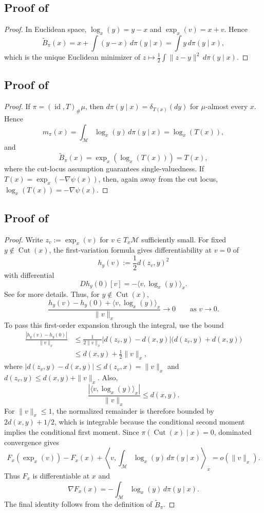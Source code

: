 \documentclass[10pt]{article} %
\theoremstyle{definition}
\providecommand{\1}{\mathbf{1}}
\providecommand{\sM}{\mathcal{M}}
\DeclareMathOperator{\Cut}{Cut}
\DeclareMathOperator{\id}{id}
\begin{document}
\subsection{Proof of }
\begin{proof}
In Euclidean space, $\log_x(y)=y-x$ and $\exp_x(v)=x+v$. Hence
\[
\widetilde B_\pi(x)=x+\int(y-x)\,d\pi(y\mid x)=\int y\,d\pi(y\mid x),
\]
which is the unique Euclidean minimizer of $z\mapsto\frac12\int\|z-y\|^2\,d\pi(y\mid x)$.
\end{proof}





\subsection{Proof of }
\begin{proof}
If $\pi=(\id,T)_\#\mu$, then $d\pi(y\mid x)=\delta_{T(x)}(dy)$ for $\mu$-almost every $x$. Hence
\[
m_\pi(x)=\int_{\sM}\log_x(y)\,d\pi(y\mid x)=\log_x(T(x)),
\]
and
\[
\widetilde B_\pi(x)=\exp_x(\log_x(T(x)))=T(x),
\]
where the cut-locus assumption guarantees single-valuedness. If $T(x)=\exp_x(-\nabla\psi(x))$, then, again away from the cut locus, $\log_x(T(x))=-\nabla\psi(x)$.
\end{proof}

\subsection{Proof of }
\begin{proof}
Write $z_v:=\exp_x(v)$ for $v\in T_x\sM$ sufficiently small. For fixed $y\notin\Cut(x)$, the first-variation formula gives differentiability at $v=0$ of
\[
h_y(v):=\frac12 d(z_v,y)^2
\]
with differential
\[
Dh_y(0)[v]=-\langle v,\log_x(y)\rangle_x.
\]
See \citet{karcher_1977_RiemannianCenterMass} for more details. Thus, for $y\notin\Cut(x)$,
\[
\frac{h_y(v)-h_y(0)+\langle v,\log_x(y)\rangle_x}{\|v\|_x}\to 0
\qquad\text{as }v\to 0.
\]
To pass this first-order expansion through the integral, use the bound
\begin{align*}
\frac{|h_y(v)-h_y(0)|}{\|v\|_x}
&\le \frac{1}{2\|v\|_x}|d(z_v,y)-d(x,y)|\bigl(d(z_v,y)+d(x,y)\bigr)\\
&\le d(x,y)+\frac12\|v\|_x,
\end{align*}
where $|d(z_v,y)-d(x,y)|\le d(z_v,x)=\|v\|_x$ and $d(z_v,y)\le d(x,y)+\|v\|_x$. Also,
\[
\frac{|\langle v,\log_x(y)\rangle_x|}{\|v\|_x}\le d(x,y).
\]
For $\|v\|_x\le 1$, the normalized remainder is therefore bounded by $2d(x,y)+1/2$, which is integrable because the conditional second moment implies the conditional first moment. Since $\pi(\Cut(x)\mid x)=0$, dominated convergence gives
\[
F_x(\exp_x(v))-F_x(x)
+
\left\langle v,\int_{\sM}\log_x(y)\,d\pi(y\mid x)\right\rangle_x
=o(\|v\|_x).
\]
Thus $F_x$ is differentiable at $x$ and
\[
\nabla F_x(x)=-\int_{\sM}\log_x(y)\,d\pi(y\mid x).
\]
The final identity follows from the definition of $\widetilde B_\pi$.
\end{proof}
\end{document}
